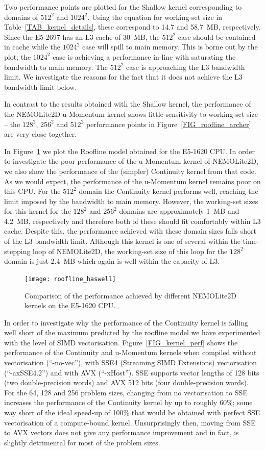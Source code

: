 \documentclass[12pt]{article}
\begin{document}
Two performance points are plotted for the Shallow kernel
corresponding to domains of $512^2$ and $1024^2$. Using the equation
for working-set size in Table~\ref{TAB_kernel_details}, these
correspond to 14.7 and 58.7~MB, respectively. Since the E5-2697 has
an L3 cache of 30~MB, the $512^2$ case should be contained in cache
while the $1024^2$ case will spill to main memory. This is borne out
by the plot; the $1024^2$ case is achieving a performance in-line
with saturating the bandwidth to main memory. The $512^2$ case is
approaching the L3 bandwidth limit. We investigate the reasons for
the fact that it does not achieve the L3 bandwidth limit below.
 
In contrast to the results obtained with the Shallow kernel, the
performance of the NEMOLite2D u-Momentum kernel shows little
sensitivity to working-set size -- the $128^2$, $256^2$ and $512^2$
performance points in Figure~\ref{FIG_roofline_archer} are very close
together.

In Figure~\ref{FIG_roofline_haswell} we plot the Roofline model
obtained for the E5-1620 CPU. In order to investigate the poor
performance of the u-Momentum kernel of NEMOLite2D, we also show the
performance of the (simpler) Continuity kernel from that code. As we
would expect, the performance of the u-Momentum kernel remains poor on
this CPU. For the $512^2$ domain the Continuity kernel performs well,
reaching the limit imposed by the bandwidth to main memory. However,
the working-set sizes for this kernel for the $128^2$ and $256^2$
domains are approximately 1~MB and 4.2~MB, respectively and therefore
both of these should fit comfortably within L3 cache. Despite this,
the performance achieved with these domain sizes falls short of the L3
bandwidth limit.  Although this kernel is one of several within the
time-stepping loop of NEMOLite2D, the working-set size of this loop
for the $128^2$ domain is just 2.4~MB which again is well within the
capacity of L3.

\begin{figure}
\centering
\texttt{[image: roofline\_haswell]}
\caption{Comparison of the performance achieved by different
  NEMOLite2D kernels on the E5-1620 CPU.}
\label{FIG_roofline_haswell}
\end{figure}

In order to investigate why the performance of the Continuity kernel
is falling well short of the maximum predicted by the roofline model
we have experimented with the level of SIMD
vectorisation. Figure~\ref{FIG_kernel_perf} shows the performance of
the Continuity and u-Momentum kernels when compiled without
vectorisation (``-no-vec''), with SSE4 (Streaming SIMD Extensions)
vectorisation (``-axSSE4.2'') and with AVX (``-xHost''). SSE supports
vector lengths of 128 bits (two double-precision words) and AVX 512
bits (four double-precision words). For the 64, 128 and 256 problem
sizes, changing from no vectorisation to SSE increases the performance
of the Continuity kernel by up to roughly 60\%; some way short of the
ideal speed-up of 100\% that would be obtained with perfect
SSE vectorisation of a compute-bound kernel. Unsurprisingly then, moving
from SSE to AVX vectors does not give any performance improvement and
in fact, is slightly detrimental for most of the problem sizes. 
\end{document}
